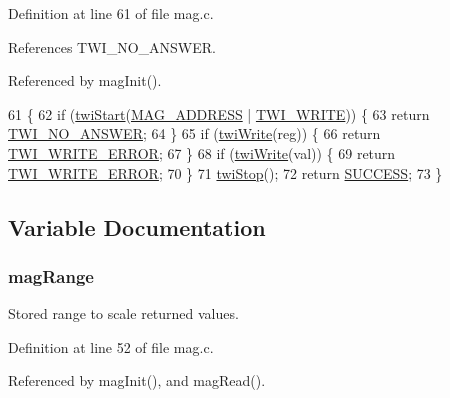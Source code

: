 Definition at line 61 of file mag.\-c.



References T\-W\-I\-\_\-\-N\-O\-\_\-\-A\-N\-S\-W\-E\-R.



Referenced by mag\-Init().


\begin{DoxyCode}
61                                                  \{
62     \textcolor{keywordflow}{if} (\hyperlink{group__twi_ga4f86edc73f37ce976ea2225519ab31cd}{twiStart}(\hyperlink{group__config_gade4e63fac819c67040e374f08d2d7230}{MAG\_ADDRESS} | \hyperlink{group__twi_ga3b68e8e777b71520f9dbfac733774d5f}{TWI\_WRITE})) \{
63         \textcolor{keywordflow}{return} \hyperlink{group__error_gga2c3e4bb40f36b262a5214e2da2bca9c5a04d5943ba652af2205c88b247e0c659c}{TWI\_NO\_ANSWER};
64     \}
65     \textcolor{keywordflow}{if} (\hyperlink{group__twi_gaf42e50aaf4a9794d3a2c000e7b407887}{twiWrite}(reg)) \{
66         \textcolor{keywordflow}{return} \hyperlink{group__error_gga2c3e4bb40f36b262a5214e2da2bca9c5ac0e3b3463dcaf220e54794b4711708c9}{TWI\_WRITE\_ERROR};
67     \}
68     \textcolor{keywordflow}{if} (\hyperlink{group__twi_gaf42e50aaf4a9794d3a2c000e7b407887}{twiWrite}(val)) \{
69         \textcolor{keywordflow}{return} \hyperlink{group__error_gga2c3e4bb40f36b262a5214e2da2bca9c5ac0e3b3463dcaf220e54794b4711708c9}{TWI\_WRITE\_ERROR};
70     \}
71     \hyperlink{group__twi_gabf581270e9537a60e2d8cf3d2c1543d1}{twiStop}();
72     \textcolor{keywordflow}{return} \hyperlink{group__error_gga2c3e4bb40f36b262a5214e2da2bca9c5ac7f69f7c9e5aea9b8f54cf02870e2bf8}{SUCCESS};
73 \}
\end{DoxyCode}


\subsection{Variable Documentation}
\hypertarget{group__mag_gaae12e12b371d0bcebe05462384a519a2}{
\subsubsection[{mag\-Range}]{ mag\-Range}}\label{group__mag_gaae12e12b371d0bcebe05462384a519a2}


Stored range to scale returned values. 



Definition at line 52 of file mag.\-c.



Referenced by mag\-Init(), and mag\-Read().

